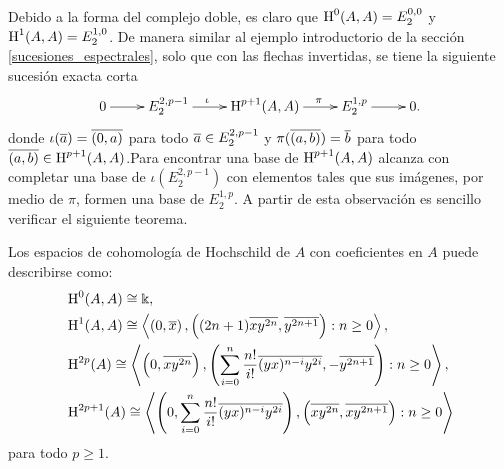 \documentclass[fleqn,../tesis.tex]{subfiles}
\begin{document}
Debido a la forma del complejo doble, es claro que $\operatorname{H}^{0}(A, A) = E^{0, 0}_{2}$ y $\operatorname{H}^{1}(A, A) = E^{1, 0}_{2}$. De manera
similar al ejemplo introductorio de la sección \ref{sucesiones_espectrales}, solo que con las flechas invertidas, se tiene la siguiente
sucesión exacta corta
\begin{align*}
\xymatrix{
    0 \ar[r] & E^{2, p - 1}_{2} \ar[r]^(0.4){\iota} & \Hy^{p + 1}(A, A) \ar[r]^(.6){\pi} & E^{1, p}_2 \ar[r] & 0.
}
\end{align*}
donde $\iota(\overline{a}) = \overline{(0, a)}$ para todo $\overline{a} \in E^{2, p - 1}_{2}$ y $\pi(\overline{(a, b)}) = \overline{b}$ para todo
$\overline{(a, b)} \in \operatorname{H}^{p + 1}(A, A)$.Para encontrar una
base de $\operatorname{H}^{p + 1}(A, A)$ alcanza con completar una base de $\iota\left(E^{2, p - 1}_{2}\right)$ con elementos
tales que sus imágenes, por medio de $\pi$, formen una base de $E^{1, p}_{2}$. A partir
de esta observación es sencillo verificar el siguiente teorema.
\begin{Teorema} \label{teo_cohomologia}
    Los espacios de cohomología de Hochschild de $A$ con coeficientes en $A$ puede describirse como:
    \begin{align*}
        &\operatorname{H}^0(A,A) \cong \Bbbk, \\
  		&\operatorname{H}^1(A,A) \cong \left\langle \left(0, \overline{x}\right), \left((2n + 1)\overline{xy^{2n}}, \overline{y^{2n + 1}}\right): n \geq 0\right\rangle, \\
  		&\operatorname{H}^{2p}(A) \cong \left\langle \left(0, \overline{xy^{2n}}\right),
  			\left(\sum_{i = 0}^n\frac{n!}{i!}\overline{(yx)^{n - i}y^{2i}}, -\overline{y^{2n + 1}} \right): n \geq 0\right\rangle,\\
  		&\operatorname{H}^{2p + 1}(A) \cong \left\langle \left(0, \sum_{i = 0}^n\frac{n!}{i!}\overline{(yx)^{n - i}y^{2i}}\right),
  			\left(\overline{xy^{2n}}, \overline{xy^{2n + 1}}\right) : n \geq 0\right\rangle 
    \end{align*}
    para todo $p\geq 1$.
\end{Teorema}
\end{document}
